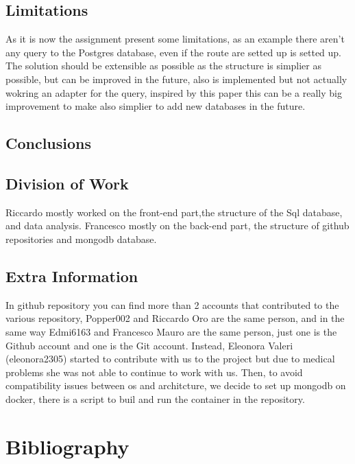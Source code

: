 \documentclass[conference]{IEEEtran}
\begin{document}
\subsection{Limitations}
As it is now the assignment present some limitations, as an example there aren't any query to the Postgres database, even if the route are setted up is setted up. 
The solution should be extensible as possible as the structure is simplier as possible, but can be improved in the future, also is implemented but not actually wokring an adapter for the query, inspired by this paper \cite{Liao2016}
this can be a really big improvement to make also simplier to add new databases in the future. 

\subsection{Conclusions}
\lipsum[15]

\subsection{Division of Work}
Riccardo mostly worked on the front-end part,the structure of the Sql database, and data analysis. Francesco mostly on the back-end part, the structure of github repositories and mongodb database.

\subsection{Extra Information}
In github repository you can find more than 2 accounts that contributed to the various repository, Popper002 and Riccardo Oro are the same person, and in the same way Edmi6163 and Francesco Mauro are the same person, just one is the Github account and one is the Git account. 
Instead, Eleonora Valeri (eleonora2305) started to contribute with us to the project but due to medical problems she was not able to continue to work with us.
Then, to avoid compatibility issues between os and architcture, we decide to set up mongodb on docker, there is a script to buil and run the container in the repository.


\section{Bibliography}

\end{document}
